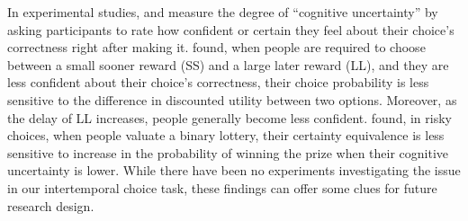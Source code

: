 \documentclass[
  12pt,
]{article}
\begin{document}
In experimental studies, \citet{bulley2022intertemporal} and
\citet{enke2023cognitive} measure the degree of ``cognitive
uncertainty'' by asking participants to rate how confident or certain
they feel about their choice's correctness right after making it.
\citet{bulley2022intertemporal} found, when people are required to
choose between a small sooner reward (SS) and a large later reward (LL),
and they are less confident about their choice's correctness, their
choice probability is less sensitive to the difference in discounted
utility between two options. Moreover, as the delay of LL increases,
people generally become less confident. \citet{enke2023cognitive} found,
in risky choices, when people valuate a binary lottery, their certainty
equivalence is less sensitive to increase in the probability of winning
the prize when their cognitive uncertainty is lower. While there have
been no experiments investigating the issue in our intertemporal choice
task, these findings can offer some clues for future research design.

\renewcommand\refname{Reference}
  
\end{document}
